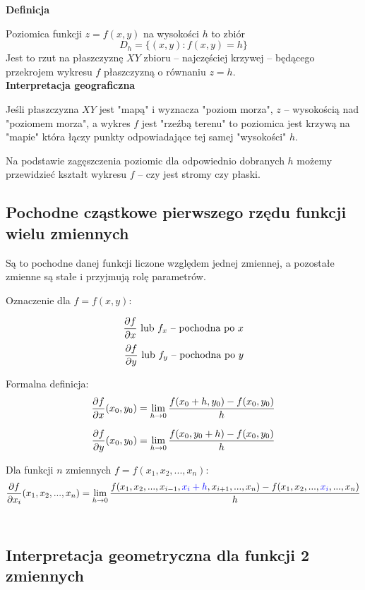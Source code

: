 \textbf{Definicja}

Poziomica funkcji $ z = f(x,y) $ na wysokości $h$ to zbiór
$$ D_h = \{ (x,y): f(x,y) = h \} $$
Jest to rzut na płaszczyznę $XY$ zbioru -- najczęściej krzywej -- będącego przekrojem wykresu $f$ płaszczyzną o równaniu $z = h$. \\

\textbf{Interpretacja geograficzna}

Jeśli płaszczyzna $XY$ jest "mapą" i wyznacza "poziom morza", $z$ -- wysokością nad "poziomem morza", a wykres $f$ jest "rzeźbą terenu"
to poziomica jest krzywą na "mapie" która łączy punkty odpowiadające tej samej "wysokości" $h$.

Na podstawie zagęszczenia poziomic dla odpowiednio dobranych $h$ możemy przewidzieć kształt wykresu $f$ -- czy jest stromy czy płaski.


\subsection*{Pochodne cząstkowe pierwszego rzędu funkcji wielu zmiennych}

Są to pochodne danej funkcji liczone względem jednej zmiennej, a pozostałe zmienne są stałe i przyjmują rolę parametrów.

Oznaczenie dla $ f = f(x,y) $:

$$ \dpartial{f}{x} \ \textrm{lub} \ f_x \ \textrm{-- pochodna po} \ x $$
$$ \frac{\partial f}{\partial y} \ \textrm{lub} \ f_y \ \textrm{-- pochodna po} \ y $$

Formalna definicja: 
$$ \frac{\partial f}{\partial x} (x_0,y_0) = \lim_{h \to 0} \frac{f(x_0 + h, y_0) - f(x_0, y_0)}{h} $$

$$ \frac{\partial f}{\partial y} (x_0,y_0) = \lim_{h \to 0} \frac{f(x_0, y_0 + h) - f(x_0, y_0)}{h} $$

Dla funkcji $n$ zmiennych $ f = f(x_1, x_2, ..., x_n) $:
$$ \frac{\partial f}{\partial x_i} (x_1, x_2, ..., x_n) = \lim_{h \to 0} \frac{f(x_1, x_2, ..., x_{i - 1}, 
\textcolor{blue}{x_i + h}, x_{i + 1}, ..., x_n) - f(x_1, x_2, ..., \textcolor{blue}{x_i}, ..., x_n)}{h} $$ \\


\subsection*{Interpretacja geometryczna dla funkcji 2 zmiennych}


